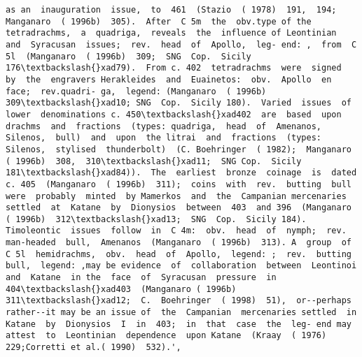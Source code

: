\documentclass[11pt]{article}
\begin{document}
\begin{Verbatim}[commandchars=\\\{\}]
 as an  inauguration  issue,  to  461  (Stazio  ( 1978)  191,  194; Manganaro  ( 1996b)  305).  After  C 5m  the  obv.type of the  tetradrachms,  a  quadriga,  reveals  the  influence of Leontinian  and  Syracusan  issues;  rev.  head  of  Apollo,  leg- end: ,  from  C 5l  (Manganaro  ( 1996b)  309;  SNG  Cop.  Sicily 176\textbackslash{}xad79).  From c. 402  tetradrachms  were  signed  by  the  engravers Herakleides  and  Euainetos:  obv.  Apollo  en face;  rev.quadri- ga,  legend: (Manganaro  ( 1996b)  309\textbackslash{}xad10; SNG  Cop.  Sicily 180).  Varied  issues  of  lower  denominations c. 450\textbackslash{}xad402  are  based  upon  drachms  and  fractions  (types: quadriga,  head  of  Amenanos,  Silenos,  bull)  and  upon  the litrai  and  fractions  (types:  Silenos,  stylised  thunderbolt)  (C. Boehringer  ( 1982);  Manganaro  ( 1996b)  308,  310\textbackslash{}xad11;  SNG Cop.  Sicily 181\textbackslash{}xad84)).  The  earliest  bronze  coinage  is  dated c. 405  (Manganaro  ( 1996b)  311);  coins  with  rev.  butting  bull were  probably  minted  by Mamerkos  and  the  Campanian mercenaries  settled  at  Katane  by  Dionysios  between  403  and 396  (Manganaro  ( 1996b)  312\textbackslash{}xad13;  SNG  Cop.  Sicily 184). Timoleontic  issues  follow  in  C 4m:  obv.  head  of  nymph;  rev. man-headed  bull,  Amenanos  (Manganaro  ( 1996b)  313). A  group  of  C 5l  hemidrachms,  obv.  head  of  Apollo,  legend: ;  rev.  butting  bull,  legend: ,may be evidence  of  collaboration  between  Leontinoi  and  Katane  in the  face  of  Syracusan  pressure  in  404\textbackslash{}xad403  (Manganaro ( 1996b)  311\textbackslash{}xad12;  C.  Boehringer  ( 1998)  51),  or--perhaps rather--it may be an issue of  the  Campanian  mercenaries settled  in  Katane  by  Dionysios  I  in  403;  in  that  case  the  leg- end may  attest  to  Leontinian  dependence  upon Katane  (Kraay  ( 1976)  229;Corretti et al.( 1990)  532).',

\end{Verbatim}
\end{document}
